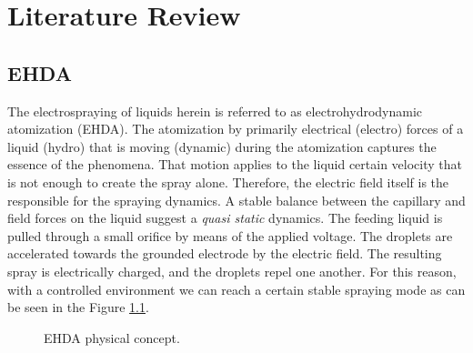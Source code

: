 \chapter{Literature Review}
\label{chap:lit_review}


\section{EHDA}
\label{sec:ehda_resume}

The electrospraying of liquids herein is referred to as electrohydrodynamic atomization (EHDA). The atomization by primarily electrical (electro) forces of a liquid (hydro) that is moving (dynamic) during the atomization captures the essence of the phenomena.\cite{Grace}
That motion applies to the liquid certain velocity that is not enough to create the spray alone. Therefore, the electric field itself is the responsible for the spraying dynamics.\cite{prunet}
A stable balance between the capillary and field forces on the liquid suggest a \emph{quasi static} dynamics.
The feeding liquid is pulled through a small orifice by means of the applied voltage.
The droplets are accelerated towards the grounded electrode by the electric field.
The resulting spray is electrically charged, and the droplets repel one another.
For this reason, with a controlled environment we can reach a certain stable spraying mode as can be seen in the Figure \ref{fig:ehda_setup_ex2}.

\begin{figure}[H]
  \centering
  \caption{EHDA physical concept\cite{Gabriel}.}
  \label{fig:ehda_setup_ex2}
\end{figure}


